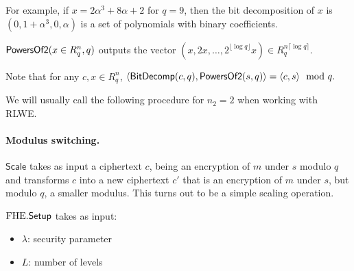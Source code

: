 \documentclass[11pt]{article}
\begin{document}
For example, if $x = 2 \alpha^3 + 8 \alpha + 2$ for $q = 9$, then the bit decomposition of $x$ is $(0, 1+\alpha^3, 0, \alpha)$ is a set of polynomials with binary coefficients.

$\mathsf{PowersOf2}(x \in R^n_q, q)$ outputs the vector $(x, 2x, \dots, 2^{\lfloor \log q \rfloor} x) \in R_q^{n \lceil \log q \rceil }$.

Note that for any $c, x \in R^n_q$, $\langle \mathsf{BitDecomp}(c, q), \mathsf{PowersOf2}(s, q)\rangle = \langle c, s \rangle \mod q. $

We will usually call the following procedure for $n_2 =2$ when working with RLWE.





\paragraph{Modulus switching.}
$\mathsf{Scale}$ takes as input a ciphertext $c$, being an encryption of $m$ under $s$ modulo $q$ and transforms $c$ into a new ciphertext $c'$ that is an encryption of $m$ under $s$, but modulo $q$, a smaller modulus. This turns out to be a simple scaling operation. 



 $\mathrm{FHE}\mathsf{.}\mathsf{Setup}$ takes as input:
 \begin{itemize}
 \item $\lambda$: security parameter
 \item $L$: number of levels 
 \end{itemize}

\end{document}
